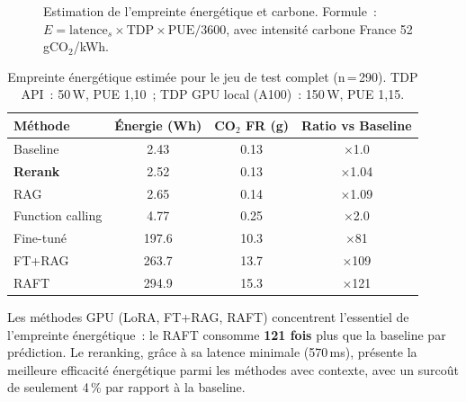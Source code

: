 \documentclass[10pt,journal,compsoc]{IEEEtran}
\begin{document}
\begin{figure}[H]
  \centering
  \caption{Estimation de l'empreinte énergétique et carbone.
           Formule~: $E = \text{latence}_s \times \text{TDP} \times
           \text{PUE} / 3600$, avec intensité carbone France
           52\,gCO$_2$/kWh.}
  \label{fig:ecologie}
\end{figure}

\begin{table}[h]
  \centering
  \caption{Empreinte énergétique estimée pour le jeu de test complet
           (n\,=\,290). TDP API~: 50\,W, PUE 1,10~;
           TDP GPU local (A100)~: 150\,W, PUE 1,15.}
  \label{tab:ecologie}
  \renewcommand{\arraystretch}{1.2}
  \begin{tabular}{lccc}
    \toprule
    \textbf{Méthode} & \textbf{Énergie (Wh)} &
    \textbf{CO$_2$ FR (g)} & \textbf{Ratio vs Baseline} \\
    \midrule
    Baseline         & 2.43  & 0.13  & $\times$1.0  \\
    \textbf{Rerank}  & 2.52  & 0.13  & $\times$1.04 \\
    RAG              & 2.65  & 0.14  & $\times$1.09 \\
    Function calling & 4.77  & 0.25  & $\times$2.0  \\
    Fine-tuné        & 197.6 & 10.3  & $\times$81   \\
    FT+RAG           & 263.7 & 13.7  & $\times$109  \\
    RAFT             & 294.9 & 15.3  & $\times$121  \\
    \bottomrule
  \end{tabular}
\end{table}

Les méthodes GPU (LoRA, FT+RAG, RAFT) concentrent l'essentiel de
l'empreinte énergétique~: le RAFT consomme \textbf{121 fois} plus
que la baseline par prédiction. Le reranking, grâce à sa latence
minimale (570\,ms), présente la meilleure efficacité énergétique
parmi les méthodes avec contexte, avec un surcoût de seulement
4\,\% par rapport à la baseline.


\end{document}
